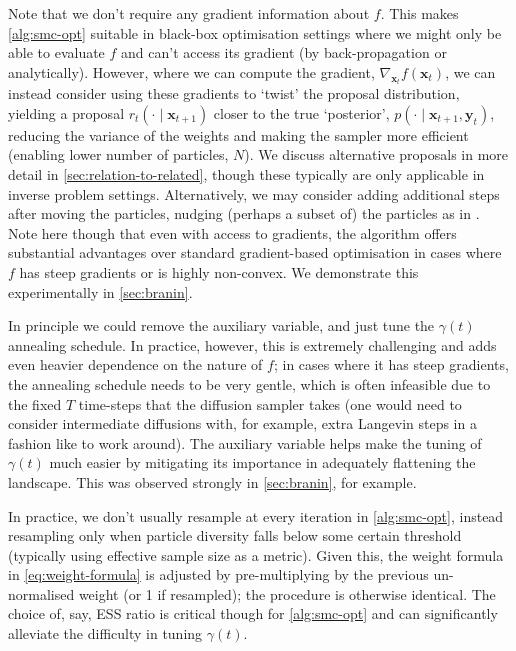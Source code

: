 \begin{remark} \label{rem:grad-free}
    Note that we don't require any gradient information about $f$. This makes \autoref{alg:smc-opt}
    suitable in black-box optimisation settings where we might only be able to evaluate $f$ and
    can't access its gradient (by back-propagation or analytically). However, where we can compute
    the gradient, $\nabla_{\mathbf{x}_{t}} f(\mathbf{x}_{t})$, we can instead consider using
    these gradients to `twist' \parencite{wuPracticalAsymptoticallyExact2023} the proposal
    distribution, yielding a proposal $r_t(\cdot \mid \mathbf{x}_{t+1})$ closer to the true
    `posterior', $p(\cdot \mid \mathbf{x}_{t+1}, \mathbf{y}_t)$, reducing the variance of the
    weights and making the sampler more efficient (enabling lower number of particles, $N$).
    We discuss alternative proposals in more detail in \autoref{sec:relation-to-related}, though
    these typically are only applicable in inverse problem settings.
    Alternatively, we may consider adding additional steps after moving the particles, nudging
    (perhaps a subset of) the particles as in \textcite{akyildizNudgingParticleFilter2020}.
    Note here though that even with access to gradients, the algorithm offers substantial
    advantages over standard gradient-based optimisation in cases where $f$ has steep gradients
    or is highly non-convex. We demonstrate this experimentally in \autoref{sec:branin}.
\end{remark}

\begin{remark}
    In principle we could remove the auxiliary variable, and just tune the $\gamma(t)$
    annealing schedule. In practice, however, this is extremely challenging and adds even heavier
    dependence on the nature of $f$; in cases where it has steep gradients, the annealing schedule
    needs to be very gentle, which is often infeasible due to the fixed $T$ time-steps that the
    diffusion sampler takes (one would need to consider intermediate diffusions with, for example, extra
    Langevin steps in a fashion like \textcite{janatiDivideandConquerPosteriorSampling2024} to work
    around). The auxiliary variable helps make the tuning of $\gamma(t)$ much easier by mitigating
    its importance in adequately flattening the landscape. This was observed strongly in
    \autoref{sec:branin}, for example.
\end{remark}

\begin{remark}
    In practice, we don't usually resample at every iteration in \autoref{alg:smc-opt}, instead
    resampling only when particle diversity falls below some certain threshold (typically using
    effective sample size as a metric). Given this, the weight formula in \autoref{eq:weight-formula} is
    adjusted by pre-multiplying by the previous un-normalised weight (or 1 if resampled); the
    procedure is otherwise identical. The choice of, say, ESS ratio is critical though for
    \autoref{alg:smc-opt} and can significantly alleviate the difficulty in tuning $\gamma(t)$.
\end{remark}

